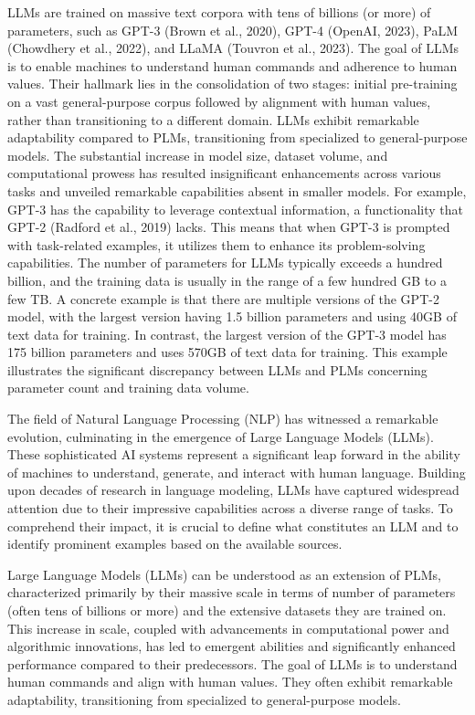LLMs are trained on massive text corpora with tens of billions (or more) of parameters, such as GPT-3 (Brown et al., 2020), GPT-4 (OpenAI, 2023), PaLM (Chowdhery et al., 2022), and LLaMA (Touvron et al., 2023). The goal of LLMs is to enable machines to understand human commands and adherence to human values. Their hallmark lies in the consolidation of two stages: initial pre-training on a vast general-purpose corpus followed by alignment with human values, rather than transitioning to a different domain. LLMs exhibit remarkable adaptability compared to PLMs, transitioning from specialized to general-purpose models. The substantial increase in model size, dataset volume, and computational prowess has resulted insignificant enhancements across various tasks and unveiled remarkable capabilities absent in smaller models. For example, GPT-3 has the capability to leverage contextual information, a functionality that GPT-2 (Radford et al., 2019) lacks. This means that when GPT-3 is prompted with task-related examples, it utilizes them to enhance its problem-solving capabilities. The number of parameters for LLMs typically exceeds a hundred billion, and the training data is usually in the range of a few hundred GB to a few TB. A concrete example is that there are multiple versions of the GPT-2 model, with the largest version having 1.5 billion parameters and using 40GB of text data for training. In contrast, the largest version of the GPT-3 model has 175 billion parameters and uses 570GB of text data for training. This example illustrates the significant discrepancy between LLMs and PLMs concerning parameter count and training data volume.

The field of Natural Language Processing (NLP) has witnessed a remarkable evolution, culminating in the emergence of Large Language Models (LLMs). These sophisticated AI systems represent a significant leap forward in the ability of machines to understand, generate, and interact with human language. Building upon decades of research in language modeling, LLMs have captured widespread attention due to their impressive capabilities across a diverse range of tasks. To comprehend their impact, it is crucial to define what constitutes an LLM and to identify prominent examples based on the available sources.

Large Language Models (LLMs) can be understood as an extension of PLMs, characterized primarily by their massive scale in terms of number of parameters (often tens of billions or more) and the extensive datasets they are trained on. This increase in scale, coupled with advancements in computational power and algorithmic innovations, has led to emergent abilities and significantly enhanced performance compared to their predecessors. The goal of LLMs is to understand human commands and align with human values. They often exhibit remarkable adaptability, transitioning from specialized to general-purpose models.

